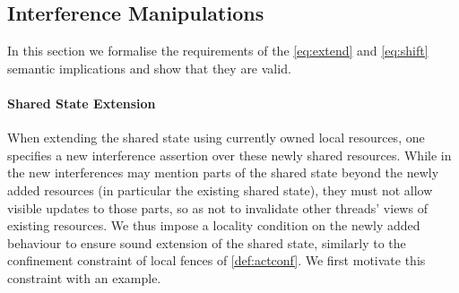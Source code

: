 %	
%


\subsection{Interference Manipulations}\label{subsec:extension}


In this section we formalise the requirements of the \eqref{eq:extend}
and \eqref{eq:shift} semantic implications and show that they are
valid.

\paragraph{Shared State Extension}
When extending the shared state using currently owned local resources,
one specifies a new interference assertion over these newly shared
resources. While in \colosl the new interferences may mention parts of
the shared state beyond the newly added resources (in particular
the existing shared state), they must not allow visible updates to those
parts, so as not to invalidate other threads' views of existing
resources. We thus impose a locality condition on the newly added
behaviour to ensure sound extension of the shared state, similarly to
the confinement constraint of local fences of
\ref{def:actconf}. We first motivate this constraint with an example.

